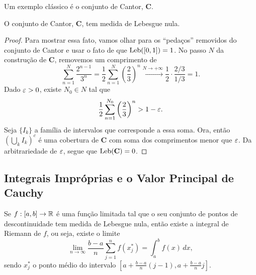         Um exemplo clássico é o conjunto de Cantor, $\mathbf{C}$.
        \begin{proposicao}
        \label{cantor-medida-nula}
            O conjunto de Cantor, $\mathbf{C}$, tem medida de Lebesgue nula.
        \end{proposicao}
        \begin{proof}
            Para mostrar essa fato, vamos olhar para os ``pedaços'' removidos do conjunto de
            Cantor e usar o fato de que $\mathrm{Leb}([0,1]) = 1$. No passo $N$ da construção de 
            $\mathbf{C}$, removemos um comprimento de
            \begin{equation*}
                \sum_{n=1}^N \frac{2^{n-1}}{3^n}=\frac{1}{2}\sum_{n=1}^N \left(\frac{2}{3}\right)^n
                \xrightarrow{N\to +\infty} \frac{1}{2}\cdot\frac{2/3}{1/3} = 1.
            \end{equation*}
            Dado $\varepsilon>0$, existe $N_0\in N$ tal que
            \begin{equation*}
                \frac{1}{2}\sum_{n=1}^{N_0} \left(\frac{2}{3}\right)^n > 1 - \varepsilon.
            \end{equation*}
            Seja $\{I_k\}$ a família de intervalos que corresponde a essa soma. Ora, então
            $\left( \bigcup_k I_k \right)^c$ é uma cobertura de $\mathbf{C}$ com soma
            dos comprimentos menor que $\varepsilon$. Da arbitrariedade de $\varepsilon$, segue que
            $\mathrm{Leb}(\mathbf{C}) = 0$.
        \end{proof}
        
    \subsection{Integrais Impróprias e o Valor Principal de Cauchy} %
        Se $f:[a,b]\to\mathbb{R}$ é uma função limitada tal que o seu conjunto de pontos de descontinuidade
        tem medida de Lebesgue nula, então existe a integral de Riemann de $f$, ou seja, existe
        o limite
        \begin{equation*}
            \lim_{n\to\infty} \frac{b-a}{n}\sum_{j=1}^n f(x_j^*) = \int_a^b f(x) \, dx,
        \end{equation*}
        sendo $x_j^*$ o ponto médio do intervalo 
        $\displaystyle{ \left[ a + \frac{b-a}{n}(j-1), a + \frac{b-a}{n}j \right] }$.
        
